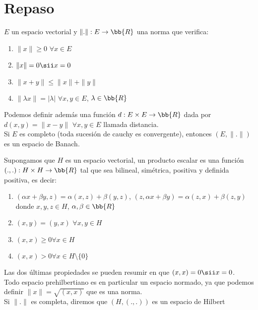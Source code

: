 \chapter*{Repaso}

\begin{definicion}
    $E$ un espacio vectorial y $\|.\|: E \to \bb{R}$ una norma que verifica:
    \begin{enumerate}
        \item $\|x\| \geq 0$ $\forall x \in E$
        \item $\|x\| = 0 \sii x=0$
        \item $\|x + y\| \leq \|x\| + \|y\|$
        \item $\|\lambda x\| = |\lambda|$ $\forall x,y\in E$, $\lambda \in \bb{R}$
    \end{enumerate} 

    Podemos definir además una función $d:E\times E \to \bb{R}$ dada por $d(x,y) = \|x-y\|$ $\forall x,y \in E$ llamada distancia.\\

    Si $E$ es completo (toda sucesión de cauchy es convergente), entonces $(E, \|.\|)$ es un espacio de Banach.
\end{definicion}

\begin{definicion}
    Supongamos que $H$ es un espacio vectorial, un producto escalar es una función $(.,.):H\times H \to \bb{R}$ tal que sea bilineal, simétrica, positiva y definida positiva, es decir:
    \begin{enumerate}
        \item $(\alpha x + \beta y, z) = \alpha(x,z) + \beta(y,z)$, $(z, \alpha x + \beta y) = \alpha(z,x) + \beta(z,y)$ donde $x,y,z\in H$, $\alpha, \beta \in \bb{R}$
        \item $(x,y) = (y,x)$ $\forall x,y\in H$
        \item $(x,x)\geq 0 \forall x \in H$
        \item $(x,x) > 0 \forall x \in H\setminus\{0\}$
    \end{enumerate}

    Las dos últimas propiedades se pueden resumir en que $(x,x) = 0 \sii x=0$.\\

    Todo espacio prehilbertiano es en particular un espacio normado, ya que podemos definir $\|x\| = \sqrt{(x,x)}$ que es una norma.\\

    Si $\|.\|$ es completa, diremos que $(H, (.,.))$ es un espacio de Hilbert
\end{definicion}

